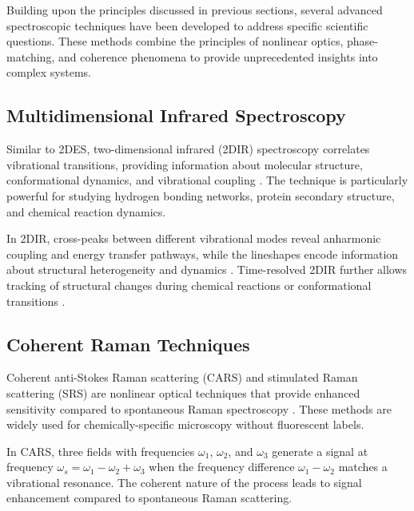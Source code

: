 \noindent Building upon the principles discussed in previous sections, several advanced spectroscopic techniques have been developed to address specific scientific questions. These methods combine the principles of nonlinear optics, phase-matching, and coherence phenomena to provide unprecedented insights into complex systems.

\subsection{Multidimensional Infrared Spectroscopy}
\label{subsec:2dir}

\noindent Similar to 2DES, two-dimensional infrared (2DIR) spectroscopy correlates vibrational transitions, providing information about molecular structure, conformational dynamics, and vibrational coupling \cite{HammZanni2011ConceptsMethods2D, KhalilEtAl2004VibrationalCoherenceTransfer}. The technique is particularly powerful for studying hydrogen bonding networks, protein secondary structure, and chemical reaction dynamics.

\noindent In 2DIR, cross-peaks between different vibrational modes reveal anharmonic coupling and energy transfer pathways, while the lineshapes encode information about structural heterogeneity and dynamics \cite{KhalilEtAl2004VibrationalCoherenceTransfer}. Time-resolved 2DIR further allows tracking of structural changes during chemical reactions or conformational transitions \cite{Fayer2009DynamicsLiquidsMolecules}.

\subsection{Coherent Raman Techniques}
\label{subsec:coherent_raman}

\noindent Coherent anti-Stokes Raman scattering (CARS) and stimulated Raman scattering (SRS) are nonlinear optical techniques that provide enhanced sensitivity compared to spontaneous Raman spectroscopy \cite{Boyd2008Contents}. These methods are widely used for chemically-specific microscopy without fluorescent labels.

\noindent In CARS, three fields with frequencies $\omega_1$, $\omega_2$, and $\omega_3$ generate a signal at frequency $\omega_s = \omega_1 - \omega_2 + \omega_3$ when the frequency difference $\omega_1 - \omega_2$ matches a vibrational resonance. The coherent nature of the process leads to signal enhancement compared to spontaneous Raman scattering.

